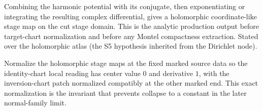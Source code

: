 \begin{lemma}
\label{lem:stage-holomorphic-coordinate-from-harmonic-dipole}
Combining the harmonic potential with its conjugate, then exponentiating or
integrating the resulting complex differential, gives a holomorphic
coordinate-like stage map on the cut stage domain.  This is the analytic
production output before target-chart normalization and before any Montel
compactness extraction.  Stated over the holomorphic atlas (the S5
hypothesis inherited from the Dirichlet node).
\end{lemma}

\begin{lemma}
\label{lem:stage-map-normalized-noncollapse}
Normalize the holomorphic stage maps at the fixed marked source data so the
identity-chart local reading has center value \(0\) and derivative \(1\), with
the inversion-chart patch normalized compatibly at the other marked end.  This
exact normalization is the invariant that prevents collapse to a constant in
the later normal-family limit.
\end{lemma}

